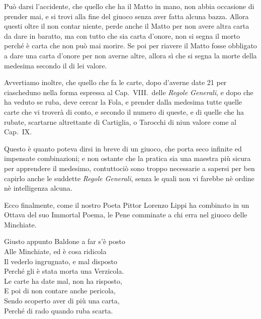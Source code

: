 \documentclass[11pt,a6paper]{article}
\begin{document}
Può darsi l'accidente, che quello che ha il Matto in mano, non abbia occasione di prender mai, e si trovi alla fine del giuoco senza aver fatta alcuna bazza. Allora questi oltre il non contar niente, perde anche il Matto per non avere altra carta da dare in baratto, ma con tutto che sia carta d'onore, non si segna il morto perché è carta che non può mai morire. Se poi per riavere il Matto fosse obbligato a dare una carta d'onore per non averne altre, allora sì che si segna la morte della medesima secondo il di lei valore.

Avvertiamo inoltre, che quello che fa le carte, dopo d'averne date 21 per ciascheduno nella forma espressa al Cap.\ VIII.\ delle \textit{Regole Generali}, e dopo che ha veduto se ruba, deve cercar la Fola, e prender dalla medesima tutte quelle carte che vi troverà di conto, e secondo il numero di queste, e di quelle che ha rubate, scartarne altrettante di Cartiglia, o Tarocchi di niun valore come al Cap.\ IX.

Questo è quanto poteva dirsi in breve di un giuoco, che porta seco infinite ed impensate combinazioni; e non ostante che la pratica sia una maestra più sicura per apprendere il medesimo, contuttociò sono troppo necessarie a sapersi per ben capirlo anche le suddette \textit{Regole Generali}, senza le quali non vi farebbe nè ordine nè intelligenza alcuna.

Ecco finalmente, come il nostro Poeta Pittor Lorenzo Lippi ha combinato in un Ottava del suo Immortal Poema, le Pene comminate a chi erra nel giuoco delle Minchiate.

  \noindent
\begin{minipage}{8cm}
{\LARGE G}iusto appunto Baldone a far s'è posto\\
Alle Minchiate, ed è cosa ridicola \vspace{2pt}\\
Il vederlo ingrugnato, e mal disposto \\
Perché gli è stata morta una Verzicola. \vspace{2pt}\\
Le carte ha date mal, non ha risposto, \\
E poi di non contare anche pericola, \vspace{2pt}\\
Sendo scoperto aver di più una carta, \\
Perché di rado quando ruba scarta. 
\end{minipage}

\vspace{6pt}
\end{document}
